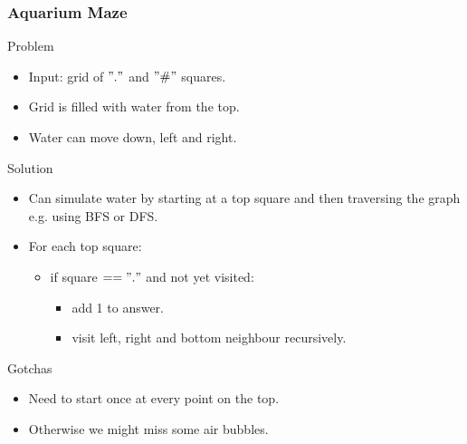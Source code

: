\documentclass{beamer}
\begin{document}
\begin{frame}
    \frametitle{Aquarium  Maze}
    \begin{block}{Problem}
        \begin{itemize}
            \item Input: grid of $"."$ and $"\#"$ squares.
            \item Grid is filled with water from the top.
            \item Water can move down, left and right.
        \end{itemize}
    \end{block} \pause
    \begin{block}{Solution}
        \begin{itemize}
            \item Can simulate water by starting at a top square and then traversing the graph e.g. using BFS or DFS.
            \pause
            \item For each top square:
            \begin{itemize}
                \item if square $== "."$ and not yet visited:
                \begin{itemize}
                    \item add 1 to answer.
                    \pause
                    \item visit left, right and bottom neighbour recursively.
                \end{itemize}
            \end{itemize}
        \end{itemize}
    \end{block} \pause
    \begin{block}{Gotchas}
        \begin{itemize}
            \item Need to start once at every point on the top.
            \pause
            \item Otherwise we might miss some air bubbles.
        \end{itemize}
    \end{block} 
\end{frame}
\end{document}
